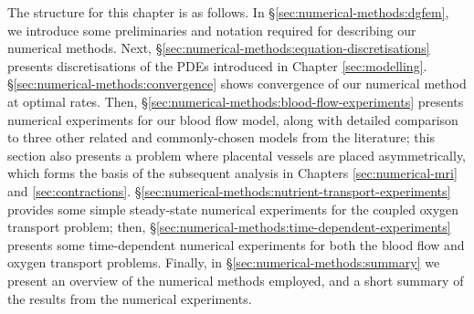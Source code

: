     The structure for this chapter is as follows. In \S\ref{sec:numerical-methods:dgfem}, we introduce some preliminaries and notation required for describing our numerical methods. Next, \S\ref{sec:numerical-methods:equation-discretisations} presents discretisations of the PDEs introduced in Chapter \ref{sec:modelling}. \S\ref{sec:numerical-methods:convergence} shows convergence of our numerical method at optimal rates. Then, \S\ref{sec:numerical-methods:blood-flow-experiments} presents numerical experiments for our blood flow model, along with detailed comparison to three other related and commonly-chosen models from the literature; this section also presents a problem where placental vessels are placed asymmetrically, which forms the basis of the subsequent analysis in Chapters \ref{sec:numerical-mri} and \ref{sec:contractions}. \S\ref{sec:numerical-methods:nutrient-transport-experiments} provides some simple steady-state numerical experiments for the coupled oxygen transport problem; then, \S\ref{sec:numerical-methods:time-dependent-experiments} presents some time-dependent numerical experiments for both the blood flow and oxygen transport problems. Finally, in \S\ref{sec:numerical-methods:summary} we present an overview of the numerical methods employed, and a short summary of the results from the numerical experiments.


